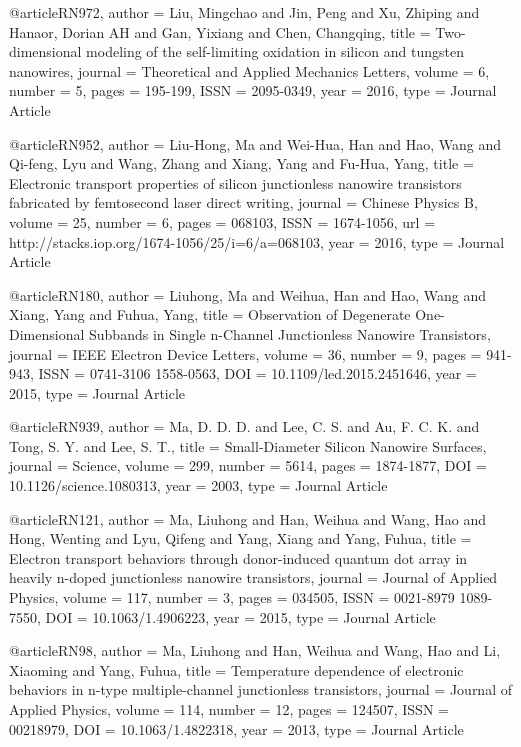 @article{RN972,
   author = {Liu, Mingchao and Jin, Peng and Xu, Zhiping and Hanaor, Dorian AH and Gan, Yixiang and Chen, Changqing},
   title = {Two-dimensional modeling of the self-limiting oxidation in silicon and tungsten nanowires},
   journal = {Theoretical and Applied Mechanics Letters},
   volume = {6},
   number = {5},
   pages = {195-199},
   ISSN = {2095-0349},
   year = {2016},
   type = {Journal Article}
}

@article{RN952,
   author = {Liu-Hong, Ma and Wei-Hua, Han and Hao, Wang and Qi-feng, Lyu and Wang, Zhang and Xiang, Yang and Fu-Hua, Yang},
   title = {Electronic transport properties of silicon junctionless nanowire transistors fabricated by femtosecond laser direct writing},
   journal = {Chinese Physics B},
   volume = {25},
   number = {6},
   pages = {068103},
   ISSN = {1674-1056},
   url = {http://stacks.iop.org/1674-1056/25/i=6/a=068103},
   year = {2016},
   type = {Journal Article}
}

@article{RN180,
   author = {Liuhong, Ma and Weihua, Han and Hao, Wang and Xiang, Yang and Fuhua, Yang},
   title = {Observation of Degenerate One-Dimensional Subbands in Single n-Channel Junctionless Nanowire Transistors},
   journal = {IEEE Electron Device Letters},
   volume = {36},
   number = {9},
   pages = {941-943},
   ISSN = {0741-3106
1558-0563},
   DOI = {10.1109/led.2015.2451646},
   year = {2015},
   type = {Journal Article}
}

@article{RN939,
   author = {Ma, D. D. D. and Lee, C. S. and Au, F. C. K. and Tong, S. Y. and Lee, S. T.},
   title = {Small-Diameter Silicon Nanowire Surfaces},
   journal = {Science},
   volume = {299},
   number = {5614},
   pages = {1874-1877},
   DOI = {10.1126/science.1080313},
   year = {2003},
   type = {Journal Article}
}

@article{RN121,
   author = {Ma, Liuhong and Han, Weihua and Wang, Hao and Hong, Wenting and Lyu, Qifeng and Yang, Xiang and Yang, Fuhua},
   title = {Electron transport behaviors through donor-induced quantum dot array in heavily n-doped junctionless nanowire transistors},
   journal = {Journal of Applied Physics},
   volume = {117},
   number = {3},
   pages = {034505},
   ISSN = {0021-8979
1089-7550},
   DOI = {10.1063/1.4906223},
   year = {2015},
   type = {Journal Article}
}

@article{RN98,
   author = {Ma, Liuhong and Han, Weihua and Wang, Hao and Li, Xiaoming and Yang, Fuhua},
   title = {Temperature dependence of electronic behaviors in n-type multiple-channel junctionless transistors},
   journal = {Journal of Applied Physics},
   volume = {114},
   number = {12},
   pages = {124507},
   ISSN = {00218979},
   DOI = {10.1063/1.4822318},
   year = {2013},
   type = {Journal Article}
}

